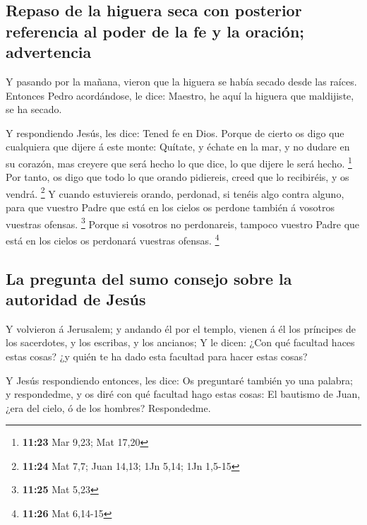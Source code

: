 \hypertarget{repaso-de-la-higuera-seca-con-posterior-referencia-al-poder-de-la-fe-y-la-oraciuxf3n-advertencia}{%
\subsection{Repaso de la higuera seca con posterior referencia al poder
de la fe y la oración;
advertencia}\label{repaso-de-la-higuera-seca-con-posterior-referencia-al-poder-de-la-fe-y-la-oraciuxf3n-advertencia}}

 Y pasando por la mañana, vieron que la higuera se había
secado desde las raíces.  Entonces Pedro acordándose, le
dice: Maestro, he aquí la higuera que maldijiste, se ha secado.

 Y respondiendo Jesús, les dice: Tened fe en Dios.
 Porque de cierto os digo que cualquiera que dijere á
este monte: Quítate, y échate en la mar, y no dudare en su corazón, mas
creyere que será hecho lo que dice, lo que dijere le será hecho.
\footnote{\textbf{11:23} Mar 9,23; Mat 17,20}  Por tanto,
os digo que todo lo que orando pidiereis, creed que lo recibiréis, y os
vendrá. \footnote{\textbf{11:24} Mat 7,7; Juan 14,13; 1Jn 5,14; 1Jn
  1,5-15}  Y cuando estuviereis orando, perdonad, si
tenéis algo contra alguno, para que vuestro Padre que está en los cielos
os perdone también á vosotros vuestras ofensas. \footnote{\textbf{11:25}
  Mat 5,23}  Porque si vosotros no perdonareis, tampoco
vuestro Padre que está en los cielos os perdonará vuestras ofensas.
\footnote{\textbf{11:26} Mat 6,14-15}

\hypertarget{la-pregunta-del-sumo-consejo-sobre-la-autoridad-de-jesuxfas}{%
\subsection{La pregunta del sumo consejo sobre la autoridad de
Jesús}\label{la-pregunta-del-sumo-consejo-sobre-la-autoridad-de-jesuxfas}}

 Y volvieron á Jerusalem; y andando él por el templo,
vienen á él los príncipes de los sacerdotes, y los escribas, y los
ancianos;  Y le dicen: ¿Con qué facultad haces estas
cosas? ¿y quién te ha dado esta facultad para hacer estas cosas?

 Y Jesús respondiendo entonces, les dice: Os preguntaré
también yo una palabra; y respondedme, y os diré con qué facultad hago
estas cosas:  El bautismo de Juan, ¿era del cielo, ó de
los hombres? Respondedme.

